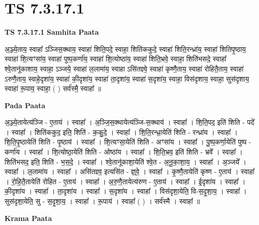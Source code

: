 \documentclass[17pt]{extarticle}
\begin{document}
\section{ TS 7.3.17.1 }

\textbf{TS 7.3.17.1 } \newline
\textbf{Samhita Paata} \newline

अ॒ञ्ज्ये॒ताय॒ स्वाहा᳚ ऽञ्जिस॒क्थाय॒ स्वाहा॑ शिति॒पदे॒ स्वाहा॒ शिति॑ककुदे॒ स्वाहा॑ शिति॒रन्ध्रा॑य॒ स्वाहा॑ शितिपृ॒ष्ठाय॒ स्वाहा॑ शि॒त्यꣳसा॑य॒ स्वाहा॑ पुष्प॒कर्णा॑य॒ स्वाहा॑ शि॒त्योष्ठा॑य॒ स्वाहा॑ शिति॒भ्रवे॒ स्वाहा॒ शिति॑भसदे॒ स्वाहा᳚ श्वे॒तानू॑काशाय॒ स्वाहा॒ ऽञ्जये॒ स्वाहा॑ ल॒लामा॑य॒ स्वाहा ऽसि॑तज्ञ्वे॒ स्वाहा॑ कृष्णै॒ताय॒ स्वाहा॑ रोहितै॒ताय॒ स्वाहा॑ ऽरुणै॒ताय॒ स्वाहे॒दृशा॑य॒ स्वाहा॑ की॒दृशा॑य॒ स्वाहा॑ ता॒दृशा॑य॒ स्वाहा॑ स॒दृशा॑य॒ स्वाहा॒ विस॑दृशाय॒ स्वाहा॒ सुस॑दृशाय॒ स्वाहा॑ रू॒पाय॒ स्वाहा॒ ( ) सर्व॑स्मै॒ स्वाहा᳚ ॥ \newline

\textbf{Pada Paata} \newline

अ॒ञ्ज्ये॒तायेत्य॑ञ्जि - ए॒ताय॑ । स्वाहा᳚ । अ॒ञ्जि॒स॒क्थायेत्य॑ञ्जि-स॒क्थाय॑ । स्वाहा᳚ । शि॒ति॒पद॒ इति॑ शिति - पदे᳚ । स्वाहा᳚ । शिति॑ककुद॒ इति॒ शिति॑ - क॒कु॒दे॒ । स्वाहा᳚ । शि॒ति॒रन्ध्रा॒येति॑ शिति - रन्ध्रा॑य । स्वाहा᳚ । शि॒ति॒पृ॒ष्ठायेति॑ शिति - पृ॒ष्ठाय॑ । स्वाहा᳚ । शि॒त्यꣳसा॒येति॑ शिति - अꣳसा॑य । स्वाहा᳚ । पु॒ष्प॒कर्णा॒येति॑ पुष्प - कर्णा॑य । स्वाहा᳚ । शि॒त्योष्ठा॒येति॑ शिति - ओष्ठा॑य । स्वाहा᳚ । शि॒ति॒भ्रव॒ इति॑ शिति - भ्रवे᳚ । स्वाहा᳚ । शिति॑भसद॒ इति॒ शिति॑ - भ॒स॒दे॒ । स्वाहा᳚ । श्वे॒तानू॑काशा॒येति॑ श्वे॒त - अ॒नू॒का॒शा॒य॒ । स्वाहा᳚ । अ॒ञ्जये᳚ । स्वाहा᳚ । ल॒लामा॑य । स्वाहा᳚ । असि॑तज्ञ्व॒ इत्यसि॑त - ज्ञ्॒वे॒ । स्वाहा᳚ । कृ॒ष्णै॒तायेति॑ कृष्ण - ए॒ताय॑ । स्वाहा᳚ । रो॒हि॒तै॒तायेति॑ रोहित - ए॒ताय॑ । स्वाहा᳚ । अ॒रु॒णै॒तायेत्य॑रुण - ए॒ताय॑ । स्वाहा᳚ । ई॒दृशा॑य । स्वाहा᳚ । की॒दृशा॑य । स्वाहा᳚ । ता॒दृशा॑य । स्वाहा᳚ । स॒दृशा॑य । स्वाहा᳚ । विस॑दृशा॒येति॒ वि-स॒दृ॒शा॒य॒ । स्वाहा᳚ । सुस॑दृशा॒येति॒ सु - स॒दृ॒शा॒य॒ । स्वाहा᳚ । रू॒पाय॑ । स्वाहा᳚ ( ) । सर्व॑स्मै । स्वाहा᳚ ॥  \newline


\textbf{Krama Paata} \newline
\end{document}
